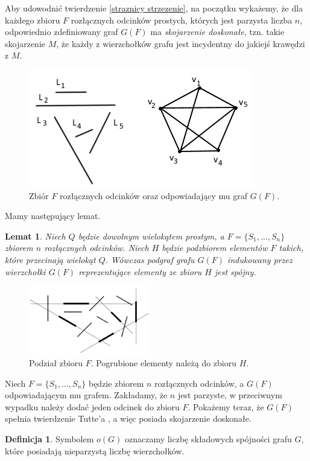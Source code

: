 \documentclass{xmgr}
\newtheorem{Lemat}{Lemat}
\theoremstyle{definition}
\newtheorem{Definicja}{Definicja}
\begin{document}
Aby udowodnić twierdzenie \ref{straznicy strzezenie}, na początku wykażemy, że dla każdego zbioru $F$ rozłącznych odcinków prostych, których jest parzysta liczba $n$, odpowiednio zdefiniowany graf $G(F)$ ma \emph{skojarzenie doskonałe}, tzn. takie skojarzenie $M$, że każdy z wierzchołków grafu jest incydentny do jakiejś krawędzi z $M$.

\begin{figure}[ht!]
 \centering
  \includegraphics{rysunki/g_f.png}
  \caption{Zbiór $F$ rozłącznych odcinków oraz odpowiadający mu graf $G(F)$.}
  \label{fig:zbior odcinkow rozlacznych}
\end{figure} 

Mamy następujący lemat.
\begin{Lemat}\label{podgraf indukowany} \cite{illumination}
Niech $Q$ będzie dowolnym wielokątem prostym, a $F = \{S_1,\ldots,S_n\}$ zbiorem $n$ rozłącznych odcinków. Niech $H$ będzie podzbiorem elementów $F$ takich, które przecinają wielokąt $Q$. Wówczas podgraf grafu $G(F)$ indukowany przez wierzchołki $G(F)$ reprezentujące elementy ze zbioru $H$ jest spójny.
\end{Lemat}
\begin{figure}[ht!]
 \centering
  \includegraphics[height=3cm]{rysunki/podzial_h.png}
  \caption{Podział zbioru $F$. Pogrubione elementy należą do zbioru $H$.}
\end{figure} 
Niech $F = \{S_1,\ldots,S_n\}$ będzie zbiorem $n$ rozłącznych odcinków, a $G(F)$ odpowiadającym mu grafem. Zakładamy, że $n$ jest parzyste, w przeciwnym wypadku należy dodać jeden odcinek do zbioru $F$. Pokażemy teraz, że $G(F)$ spełnia twierdzenie Tutte'a \cite{tutte}, a więc posiada skojarzenie doskonałe.
\begin{Definicja}
	Symbolem $o(G)$ oznaczamy liczbę składowych spójności grafu $G$, które posiadają nieparzystą liczbę wierzchołków.
\end{Definicja}
\end{document}
